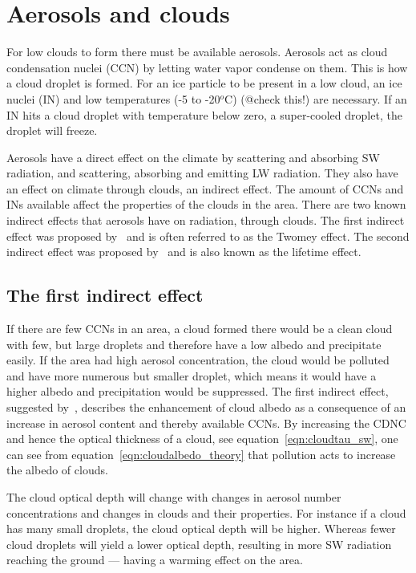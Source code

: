 \section{Aerosols and clouds}%
For low clouds to form there must be available aerosols. Aerosols act as cloud condensation nuclei (CCN) by letting water vapor condense on them. This is how a cloud droplet is formed. For an ice particle to be present in a low cloud, an ice nuclei (IN) and low temperatures (-5 to -20$^o$C) (@check this!)
are necessary. If an IN hits a cloud droplet with temperature below zero, a super-cooled droplet, the droplet will freeze.

Aerosols have a direct effect on the climate by scattering and absorbing SW radiation, and scattering, absorbing and emitting LW radiation.%
They also have an effect on climate through clouds, an indirect effect. The amount of CCNs and INs available affect the properties of the clouds in the area. There are two known indirect effects that aerosols have on radiation, through clouds. The first indirect effect was proposed by~\citet{Twomey1974} and is often referred to as the Twomey effect. The second indirect effect was proposed by~\citet{Albrecht1989} and is also known as the lifetime effect.

\subsection{The first indirect effect}%
If there are few CCNs in an area, a cloud formed there would be a clean cloud with few, but large droplets and therefore have a low albedo and precipitate easily. If the area had high aerosol concentration, the cloud would be polluted and have more numerous but smaller droplet, which means it would have a higher albedo and precipitation would be suppressed. 
The first indirect effect, suggested by~\citet{Twomey1974}, describes the enhancement of cloud albedo as a consequence of an increase in aerosol content and thereby available CCNs.
By increasing the CDNC and hence the optical thickness of a cloud, see equation~\ref{eqn:cloudtau_sw}, one can see from equation~\ref{eqn:cloudalbedo_theory} that pollution acts to increase the albedo of clouds.

The cloud optical depth will change with changes in aerosol number concentrations and changes in clouds and their properties. For instance if a cloud has many small droplets, the cloud optical depth will be higher. Whereas fewer cloud droplets will yield a lower optical depth, resulting in more SW radiation reaching the ground —  having a warming effect on the area. 

